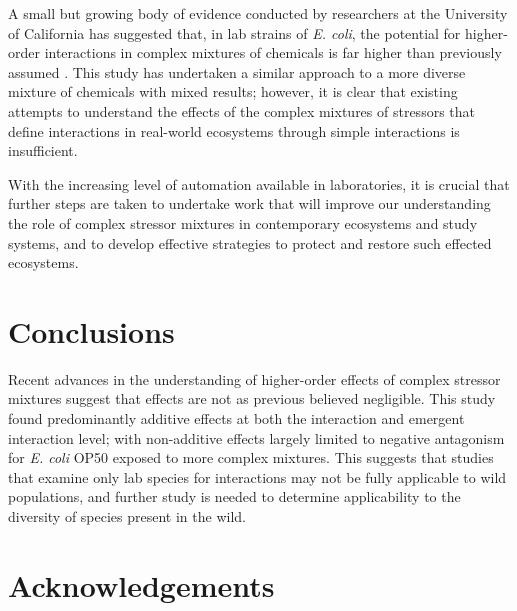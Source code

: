 \documentclass[final,1p,times]{elsarticle}
\begin{document}
A small but growing body of evidence conducted by researchers at the University of California has suggested that, in lab strains of \textit{E. coli}, the potential for higher-order interactions in complex mixtures of chemicals is far higher than previously assumed \cite{Beppler2016UncoveringStressors,Tekin2016,Tekin2017PrevalenceInteractions}.  This study has undertaken a similar approach to a more diverse mixture of chemicals with mixed results; however, it is clear that existing attempts to understand the effects of the complex mixtures of stressors that define interactions in real-world ecosystems through simple interactions is insufficient.

With the increasing level of automation available in laboratories, it is crucial that further steps are taken to undertake work that will improve our understanding the role of complex stressor mixtures in contemporary ecosystems and study systems, and to develop effective strategies to protect and restore such effected ecosystems.

\section{Conclusions}
\label{S:5}

Recent advances in the understanding of higher-order effects of complex stressor mixtures suggest that effects are not as previous believed negligible. This study found predominantly additive effects at both the interaction and emergent interaction level; with non-additive effects largely limited to negative antagonism for \textit{E. coli} OP50 exposed to more complex mixtures. This suggests that studies that examine only lab species for interactions may not be fully applicable to wild populations, and further study is needed to determine applicability to the diversity of species present in the wild.

\section{Acknowledgements}
\label{S:6}

\end{document}
